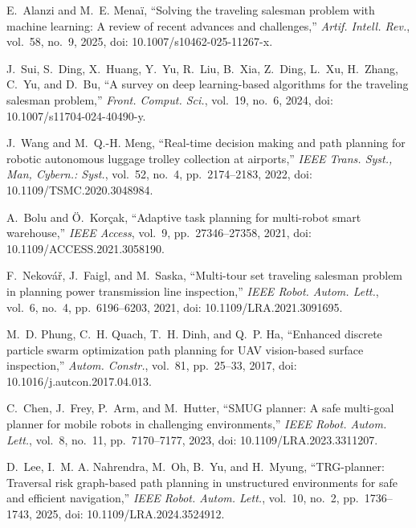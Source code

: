 E.~Alanzi and M.~E. Mena\"i,
``Solving the traveling salesman problem with machine learning: A review of recent advances and challenges,''
\textit{Artif. Intell. Rev.}, vol.~58, no.~9, 2025,
doi: 10.1007/s10462-025-11267-x.

J.~Sui, S.~Ding, X.~Huang, Y.~Yu, R.~Liu, B.~Xia, Z.~Ding, L.~Xu, H.~Zhang, C.~Yu, and D.~Bu,
``A survey on deep learning-based algorithms for the traveling salesman problem,''
\textit{Front. Comput. Sci.}, vol.~19, no.~6, 2024,
doi: 10.1007/s11704-024-40490-y.


J.~Wang and M.~Q.-H. Meng,
``Real-time decision making and path planning for robotic autonomous luggage trolley collection at airports,''
\textit{IEEE Trans. Syst., Man, Cybern.: Syst.}, vol.~52, no.~4, pp.~2174--2183, 2022,
doi: 10.1109/TSMC.2020.3048984.

A.~Bolu and \"O.~Kor\c{c}ak,
``Adaptive task planning for multi-robot smart warehouse,''
\textit{IEEE Access}, vol.~9, pp.~27346--27358, 2021,
doi: 10.1109/ACCESS.2021.3058190.

F.~Nekov\'a\v{r}, J.~Faigl, and M.~Saska,
``Multi-tour set traveling salesman problem in planning power transmission line inspection,''
\textit{IEEE Robot. Autom. Lett.}, vol.~6, no.~4, pp.~6196--6203, 2021,
doi: 10.1109/LRA.2021.3091695.

M.~D. Phung, C.~H. Quach, T.~H. Dinh, and Q.~P. Ha,
``Enhanced discrete particle swarm optimization path planning for UAV vision-based surface inspection,''
\textit{Autom. Constr.}, vol.~81, pp.~25--33, 2017,
doi: 10.1016/j.autcon.2017.04.013.


C.~Chen, J.~Frey, P.~Arm, and M.~Hutter,
``SMUG planner: A safe multi-goal planner for mobile robots in challenging environments,''
\textit{IEEE Robot. Autom. Lett.}, vol.~8, no.~11, pp.~7170--7177, 2023,
doi: 10.1109/LRA.2023.3311207.

D.~Lee, I.~M. A. Nahrendra, M.~Oh, B.~Yu, and H.~Myung,
``TRG-planner: Traversal risk graph-based path planning in unstructured environments for safe and efficient navigation,''
\textit{IEEE Robot. Autom. Lett.}, vol.~10, no.~2, pp.~1736--1743, 2025,
doi: 10.1109/LRA.2024.3524912.

